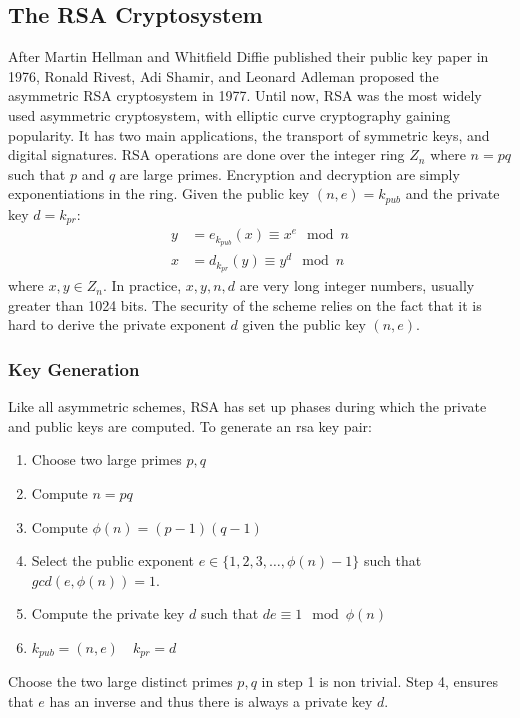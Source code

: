 \documentclass{math}
\begin{document}
\subsection*{The RSA Cryptosystem}
After Martin Hellman and Whitfield Diffie published their public key paper in
1976, Ronald Rivest, Adi Shamir, and Leonard Adleman proposed the asymmetric
RSA cryptosystem in 1977. Until now, RSA was the most widely used asymmetric
cryptosystem, with elliptic curve cryptography gaining popularity. It has two
main applications, the transport of symmetric keys, and digital signatures.
RSA operations are done over the integer ring \( Z_n \) where \( n = pq \)
such that \( p \) and \( q \) are large primes. Encryption and decryption are
simply exponentiations in the ring. Given the public key \( (n,e) = k_{pub} \)
and the private key \( d = k_{pr} \):
\begin{align*}
  y &= e_{k_{pub}}(x) \equiv x^e\mod n \\
  x &= d_{k_{pr}}(y) \equiv y^d\mod n
\end{align*}
where \( x,y \in Z_n \). In practice, \( x,y,n,d \) are very long integer
numbers, usually greater than 1024 bits. The security of the scheme relies on
the fact that it is hard to derive the private exponent \( d \) given the
public key \( (n,e) \).

\subsubsection*{Key Generation}
Like all asymmetric schemes, RSA has set up phases during which the private and
public keys are computed. To generate an rsa key pair:
\begin{enumerate}
  \item Choose two large primes \( p,q \)
  \item Compute \( n = pq \)
  \item Compute \( \phi(n) = (p-1)(q-1) \)
  \item Select the public exponent \( e\in\{1,2,3,\dots,\phi(n)-1\} \) such that
  \( gcd(e,\phi(n)) = 1 \).
  \item Compute the private key \( d \) such that \( de \equiv 1\mod\phi(n) \)
  \item \( k_{pub} = (n,e) \quad k_{pr} = d \)
\end{enumerate}
Choose the two large distinct primes \( p,q \) in step 1 is non trivial. Step
4, ensures that \( e \) has an inverse and thus there is always a private key
\( d \).
\end{document}

